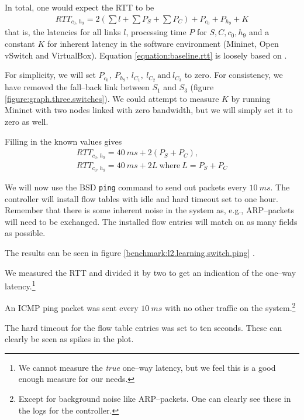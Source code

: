 In total, one would expect the \acf{RTT} to be
\begin{gather}
  RTT_{c_0, h_9} = 2\left( \sum l + \sum P_S + \sum P_C \right) + P_{c_0} + P_{h_9} + K
  \label{equation:baseline.rtt}
\end{gather}%
that is, the latencies for all links $l$, processing time $P$ for
$S,C,c_0,h_9$ and a constant $K$ for inherent latency in the software
environment (Mininet, Open vSwitch and VirtualBox).  Equation
\ref{equation:baseline.rtt} is loosely based on
\cite{DBLP:conf/cnsm/PhemiusB13}.

For simplicity, we will set $P_{c_0},~P_{h_9},~l_{C_1},~l_{C_2}~\text{and}~
l_{C_3}$ to zero.  For consistency, we have removed the fall--back link
between $S_1$ and $S_3$ (figure \ref{figure:graph.three.switches}).
We could attempt to measure $K$ by running Mininet with two nodes linked
with zero bandwidth, but we will simply set it to zero as well.

Filling in the known values gives
\begin{gather}
  RTT_{c_0,h_9} = 40~ms + 2\left( P_S + P_C \right) ,
  \\
  RTT_{c_0,h_9} = 40~ms + 2L~\text{where}~L = P_S + P_C
  \label{equation:expected.baseline.rtt}
\end{gather}

We will now use the BSD \texttt{ping} command to send out packets every
$10~ms$.  The controller will install flow tables with idle and hard timeout
set to one hour.  Remember that there is some inherent noise in the system
as, e.g., ARP--packets will need to be exchanged.  The installed flow
entries will match on as many fields as possible.

The results can be seen in figure
\ref{benchmark:l2.learning.switch.ping}
.

We measured the \ac{RTT} and divided it by two to get an indication of the
one--way latency.\footnote{We cannot measure the \textit{true} one--way
latency, but we feel this is a good enough measure for our needs.}

An ICMP ping packet was sent every $10~ms$ with no other traffic on the
system.\footnote{Except for background noise like ARP--packets.  One can
clearly see these in the logs for the controller.}

The hard timeout for the flow table entries was set to ten seconds.  These
can clearly be seen as spikes in the plot.

